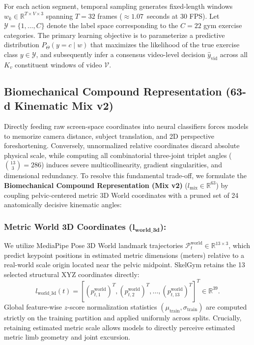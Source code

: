\documentclass[runningheads]{llncs}
\begin{document}
For each action segment, temporal sampling generates fixed-length windows $w_k \in \mathbb{R}^{T \times V \times 3}$ spanning $T = 32$ frames ($\approx 1.07$~seconds at 30 FPS). Let $\mathcal{Y} = \{1, \dots, C\}$ denote the label space corresponding to the $C = 22$ gym exercise categories. The primary learning objective is to parameterize a predictive distribution $P_\Theta(y = c \mid w)$ that maximizes the likelihood of the true exercise class $y \in \mathcal{Y}$, and subsequently infer a consensus video-level decision $\hat{y}_{\text{vid}}$ across all $K_v$ constituent windows of video $\mathcal{V}$.

\subsection{Biomechanical Compound Representation (63-d Kinematic Mix v2)}
Directly feeding raw screen-space coordinates into neural classifiers forces models to memorize camera distance, subject translation, and 2D perspective foreshortening. Conversely, unnormalized relative coordinates discard absolute physical scale, while computing all combinatorial three-joint triplet angles ($\binom{13}{3} = 286$) induces severe multicollinearity, gradient singularities, and dimensional redundancy. To resolve this fundamental trade-off, we formulate the \textbf{Biomechanical Compound Representation (Mix v2)} ($l_{\text{mix}} \in \mathbb{R}^{63}$) by coupling pelvic-centered metric 3D World coordinates with a pruned set of 24 anatomically decisive kinematic angles:

\subsubsection{Metric World 3D Coordinates ($\mathbf{l_{\text{world\_3d}}}$):}
We utilize MediaPipe Pose 3D World landmark trajectories $\mathcal{P}_t^{\text{world}} \in \mathbb{R}^{13 \times 3}$, which predict keypoint positions in estimated metric dimensions (meters) relative to a real-world scale origin located near the pelvic midpoint. SkelGym retains the 13 selected structural XYZ coordinates directly:
\begin{equation}
    l_{\text{world\_3d}}(t) = \left[ (p_{t, 1}^{\text{world}})^T, (p_{t, 2}^{\text{world}})^T, \dots, (p_{t, 13}^{\text{world}})^T \right]^T \in \mathbb{R}^{39}.
\end{equation}
Global feature-wise $z$-score normalization statistics $(\mu_{\text{train}}, \sigma_{\text{train}})$ are computed strictly on the training partition and applied uniformly across splits. Crucially, retaining estimated metric scale allows models to directly perceive estimated metric limb geometry and joint excursion.
\end{document}
